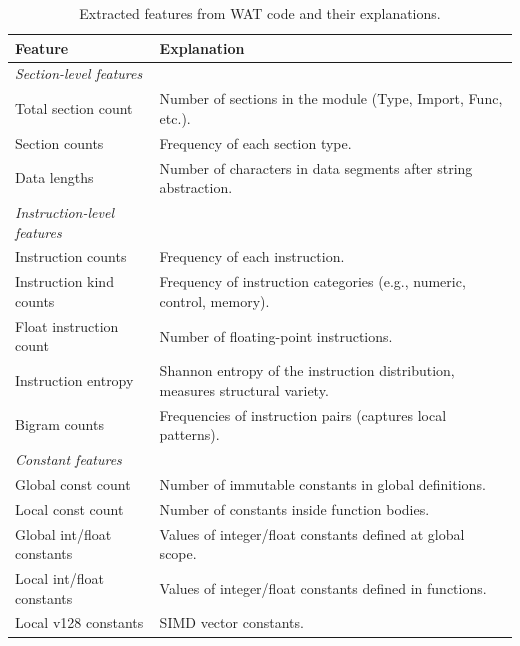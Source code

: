 \begin{table}[ht!]
\scriptsize
\centering
\caption{Extracted features from WAT code and their explanations.}
\begin{tabular}{l|l}
\toprule
\textbf{Feature} & \textbf{Explanation} \\
\midrule
\textit{Section-level features} & \\
\hspace{0.5cm} Total section count & Number of sections in the module (Type, Import, Func, etc.). \\
\hspace{0.5cm} Section counts & Frequency of each section type. \\
\hspace{0.5cm} Data lengths & Number of characters in data segments after string abstraction. \\

\midrule
\textit{Instruction-level features} & \\
\hspace{0.5cm} Instruction counts & Frequency of each instruction. \\
\hspace{0.5cm} Instruction kind counts & Frequency of instruction categories (e.g., numeric, control, memory). \\
\hspace{0.5cm} Float instruction count & Number of floating-point instructions. \\
\hspace{0.5cm} Instruction entropy & Shannon entropy of the instruction distribution, measures structural variety. \\
\hspace{0.5cm} Bigram counts & Frequencies of instruction pairs (captures local patterns). \\

\midrule
\textit{Constant features} & \\
\hspace{0.5cm} Global const count & Number of immutable constants in global definitions. \\
\hspace{0.5cm} Local const count & Number of constants inside function bodies. \\
\hspace{0.5cm} Global int/float constants & Values of integer/float constants defined at global scope. \\
\hspace{0.5cm} Local int/float constants & Values of integer/float constants defined in functions. \\
\hspace{0.5cm} Local v128 constants & SIMD vector constants. \\


\end{tabular}
\end{table}
